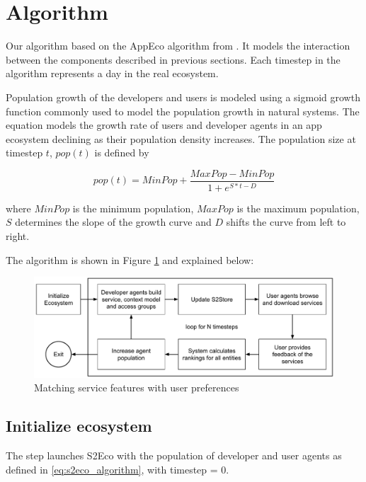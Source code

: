\section{Algorithm}

Our algorithm based on the AppEco algorithm from \cite{lim2012successful}. It models the interaction between the components described in previous sections. Each timestep in the algorithm represents a day in the real ecosystem.

Population growth of the developers and users is modeled using a sigmoid growth function commonly used to model the population growth in natural systems. The equation models the growth rate of users and developer agents in an app ecosystem declining as their population density increases. The population size at timestep $t$, $pop(t)$ is defined by 

\begin{equation}\label{eq:s2eco_algorithm}
  pop(t)=MinPop + \frac{MaxPop - MinPop}{1+e^{S*t-D}}
\end{equation}

where $MinPop$ is the minimum population, $MaxPop$ is the maximum population, $S$ determines the slope of the growth curve and $D$ shifts the curve from left to right.

The algorithm is shown in Figure \ref{fig:algorithm-flow} and explained below:

\begin{figure}[!htb]
  \centering
  \includegraphics[width=13cm]{figures/algorithm-flow.pdf}
  \caption{Matching service features with user preferences}
  \label{fig:algorithm-flow}
\end{figure}

\subsection{Initialize ecosystem}

The step launches S2Eco with the population of developer and user agents as defined in \ref{eq:s2eco_algorithm}, with timestep = 0.

